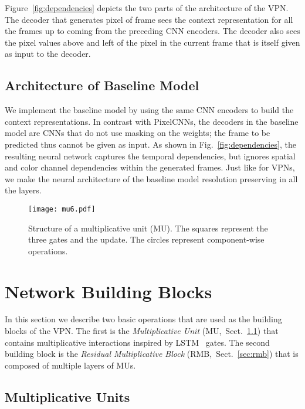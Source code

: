 \documentclass{article}
\newcommand{\figref}[1]{Fig.~\ref{#1}}
\newcommand{\sref}[1]{Sect.~\ref{#1}}
\begin{document}
Figure~\ref{fig:dependencies} depicts the two parts of the architecture of the VPN. The decoder that generates pixel  of frame  sees the context representation for all the frames up to  coming from the preceding CNN encoders. The decoder also sees the pixel values above and left of the pixel  in the current frame  that is itself given as input to the decoder.

\subsection{Architecture of Baseline Model}

We implement the baseline model by using the same CNN encoders to build the context representations. In contrast with PixelCNNs, the decoders in the baseline model are CNNs that do not use masking on the weights; the frame to be predicted thus cannot be given as input. As shown in \figref{fig:dependencies}, the resulting neural network captures the temporal dependencies, but ignores spatial and color channel dependencies within the generated frames. Just like for VPNs, we make the neural architecture of the baseline model resolution preserving in all the layers. 


\begin{figure}
\vspace{-1cm}
\centering
\texttt{[image: mu6.pdf]}
\caption{Structure of a multiplicative unit (MU). The squares represent the three gates and the update. The circles represent component-wise operations.}
\label{fig:mu}
\end{figure}

\section{Network Building Blocks}
\label{sec:impl_details}


In this section we describe two basic operations that are used as the building blocks of the VPN. 
The first is the \emph{Multiplicative Unit} (MU,~\sref{sec:mu}) that contains multiplicative interactions 
inspired by LSTM~\citep{hochreiter1997long} gates. 
The second building block is the \emph{Residual Multiplicative Block} (RMB,~\sref{sec:rmb}) that is composed of multiple layers of MUs. 

\subsection{Multiplicative Units}
\label{sec:mu}
\end{document}
